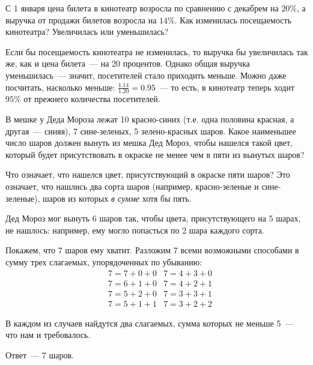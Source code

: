 \begin{itemize}
\itB С 1 января цена билета в кинотеатр возросла по сравнению с декабрем на $20 \%$, а выручка от продажи билетов возросла на $14 \%$. Как изменилась посещаемость кинотеатра? Увеличилась или уменьшилась?

\itr Если бы посещаемость кинотеатра не изменилась, то выручка бы увеличилась так же, как и цена билета~— на 20 процентов. Однако общая выручка уменьшилась~— значит, посетителей стало приходить меньше. Можно даже посчитать, насколько меньше: $\tfrac{1.14}{1.20} = 0.95$~— то есть, в кинотеатр теперь ходит $95 \%$ от прежнего количества посетителей.

\itC В мешке у Деда Мороза лежат 10 красно-синих (т.е. одна половина красная, а другая~— синяя), 7 сине-зеленых, 5 зелено-красных шаров. Какое наименьшее число шаров должен вынуть из мешка Дед Мороз, чтобы нашелся такой цвет, который будет присутствовать в окраске не менее чем в пяти из вынутых шаров?

\itr Что означает, что нашелся цвет, присутствующий в окраске пяти шаров? Это означает, что нашлись два сорта шаров (например, красно-зеленые и сине-зеленые), шаров из которых {\itshape в сумме} хотя бы пять.

Дед Мороз мог вынуть 6 шаров так, чтобы цвета, присутствующего на 5 шарах, не нашлось: например, ему могло попасться по 2 шара каждого сорта.

Покажем, что 7 шаров ему хватит. Разложим 7 всеми возможными способами в сумму трех слагаемых, упорядоченных по убыванию:
\begin{align*}
	& 7 = 7+0+0	& 7 = 4+3+0	\\
	& 7 = 6+1+0	& 7 = 4+2+1	\\
	& 7 = 5+2+0	& 7 = 3+3+1	\\
	& 7 = 5+1+1	& 7 = 3+2+2
\end{align*}

В каждом из случаев найдутся два слагаемых, сумма которых не меньше 5~— что нам и требовалось.

Ответ~— 7 шаров.
\bigbreak\noindent

\end{itemize}



